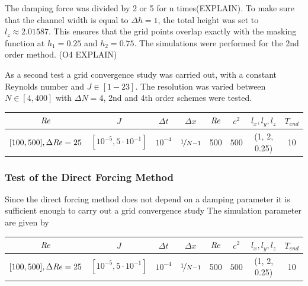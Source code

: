 The damping force was divided by 2 or 5 for n times(EXPLAIN).
To make sure that the channel width is equal to $\Delta h = 1$, the total height was set to $l_z\approx2.01587$.
This ensures that the grid points overlap exactly with the masking function at $h_1=0.25$ and $h_2=0.75$.
The simulations were performed for the 2nd order method. (O4 EXPLAIN)

As a second test a grid convergence study was carried out, with a constant Reynolds number and $J \in [1-23]$.
The resolution was varied between $N\in [4, 400]$ with $\Delta N = 4$, 2nd and 4th order schemes were tested.

\begin{center}
\vspace*{0.7ex}
\begin{tabular}{c|c|c|c|c|c|c|c }
 $ \mbox{\textit{Re}}  $                      & $J$ &  $\Delta t$ & $\Delta x$            & $\mbox{\textit{Re}}$  & $c^2$   & $l_x, l_y, l_z$ & $T_{end}$\\
\hline
 $[100, 500], \Delta \mbox{\textit{Re}} = 25 $& $[10^{-5}, 5\cdot10^{-1}]  $ &  $10^{-4}$ & $\nicefrac{1}{N - 1}$ & 500     & $500$   & (1, 2, 0.25)  & 10\\
\end{tabular}
\vspace*{0.7ex}
\end{center}

\subsubsection{Test of the Direct Forcing Method}

Since the direct forcing method does not depend on a damping parameter it is sufficient enough
to carry out a grid convergence study
The simulation parameter are given by

\begin{center}
\vspace*{0.7ex}
\begin{tabular}{c|c|c|c|c|c|c|c }
 $ \mbox{\textit{Re}}  $                      & $J$ &  $\Delta t$ & $\Delta x$            & $\mbox{\textit{Re}}$  & $c^2$   & $l_x, l_y, l_z$ & $T_{end}$\\
\hline
 $[100, 500], \Delta \mbox{\textit{Re}} = 25 $& $[10^{-5}, 5\cdot10^{-1}]  $ &  $10^{-4}$ & $\nicefrac{1}{N - 1}$ & 500     & $500$   & (1, 2, 0.25)  & 10\\
\end{tabular}
\vspace*{0.7ex}
\end{center}

